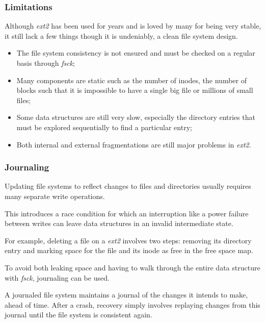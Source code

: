 
\begin{frame}
  \frametitle{Limitations}

  Although \textit{ext2} has been used for years and is loved by many for
  being very stable, it still lack a few things though it is undeniably,
  a clean file system design.

  \begin{itemize}
    \item
      The file system consistency is not ensured and must be checked on
      a regular basis through \textit{fsck};
    \item
      Many components are static such as the number of inodes, the number of
      blocks \etc{} such that it is impossible to have a single big file
      or millions of small files;
    \item
      Some data structures are still very slow, especially the directory
      entries that must be explored sequentially to find a particular entry;
    \item
      Both internal and external fragmentations are still major problems
      in \textit{ext2}.
  \end{itemize}
\end{frame}


\begin{frame}
  \frametitle{Journaling}

  Updating file systems to reflect changes to files and directories usually
  requires many separate write operations.

  \-

  This introduces a race condition for which an interruption like a power
  failure between writes can leave data structures in an invalid intermediate
  state.

  \-

  For example, deleting a file on a \textit{ext2} involves two steps: removing
  its directory entry and marking space for the file and its inode as free in
  the free space map.

  \-

  To avoid both leaking space and having to walk through the entire data
  structure with \textit{fsck}, journaling can be used.

  \-

  A journaled file system maintains a journal of the changes it intends to
  make, ahead of time. After a crash, recovery simply involves replaying
  changes from this journal until the file system is consistent again.
\end{frame}

